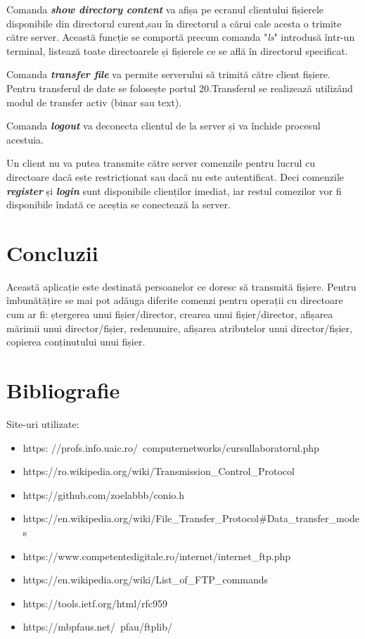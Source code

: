 \documentclass[runningheads]{llncs}
\begin{document}
\par Comanda \textit{\textbf{show directory content}} va afișa pe ecranul clientului fișierele disponibile din directorul curent,sau în directorul a cărui cale acesta o trimite către server. Această funcție se comportă precum comanda "\textit{ls}" introdusă într-un terminal, listează toate directoarele și fișierele ce se află în directorul specificat.
\par Comanda \textit{\textbf{transfer file}} va permite serverului să trimită către client fișiere. Pentru transferul de date se folosește portul 20.Transferul se realizează utilizând modul de transfer activ (binar sau text).
\par Comanda \textit{\textbf{logout}} va deconecta clientul de la server și va închide procesul acestuia.

\par Un client nu va putea transmite către server comenzile pentru lucrul cu directoare dacă este restricționat sau dacă nu este autentificat. Deci comenzile \textit{\textbf{register}} și  \textit{\textbf{login}} sunt disponibile clienților imediat, iar restul comezilor vor fi disponibile îndată ce aceștia se conectează la server.

\section{Concluzii}
\par Această aplicație este destinată persoanelor ce doresc să transmită fișiere. Pentru îmbunătățire se mai pot adăuga diferite comenzi pentru operații cu directoare cum ar fi: ștergerea unui fișier/director, crearea unui fișier/director, afișarea mărimii unui director/fișier, redenumire, afișarea atributelor unui director/fișier, copierea conținutului unui fișier.

\section{Bibliografie}

Site-uri utilizate:
\begin{itemize}
  \item https: //profs.info.uaic.ro/~computernetworks/cursullaboratorul.php
  \item https://ro.wikipedia.org/wiki/Transmission\_Control\_Protocol
  \item https://github.com/zoelabbb/conio.h
  \item https://en.wikipedia.org/wiki/File\_Transfer\_Protocol\#Data\_transfer\_modes
  \item https://www.competentedigitale.ro/internet/internet\_ftp.php
  \item https://en.wikipedia.org/wiki/List\_of\_FTP\_commands
  \item https://tools.ietf.org/html/rfc959
  \item https://mbpfaus.net/~pfau/ftplib/
  
 
\end{itemize}
\end{document}
